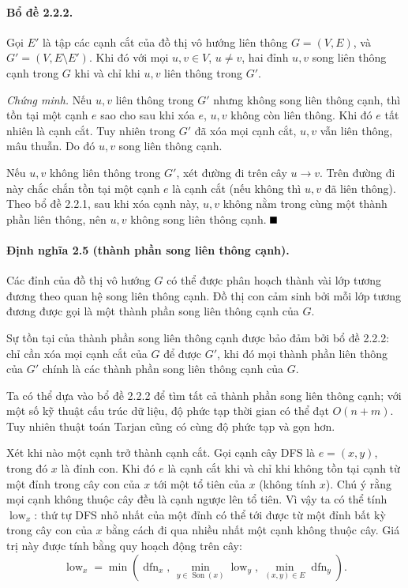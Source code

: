 \documentclass[11pt]{article}
\renewcommand{\leadsto}{\mathrel{\longrightarrow}}
\providecommand{\square}{\mathord{\vcenter{\hrule height .6em width .6em}}}
\begin{document}
\paragraph{Bổ đề 2.2.2.}
Gọi $E'$ là tập các cạnh cắt của đồ thị vô hướng liên thông $G=(V,E)$, và
$G'=(V,E\setminus E')$. Khi đó với mọi $u,v\in V$, $u\ne v$, hai đỉnh $u,v$
song liên thông cạnh trong $G$ khi và chỉ khi $u,v$ liên thông trong $G'$.

\emph{Chứng minh.}
Nếu $u,v$ liên thông trong $G'$ nhưng không song liên thông cạnh, thì tồn tại
một cạnh $e$ sao cho sau khi xóa $e$, $u,v$ không còn liên thông. Khi đó $e$ tất
nhiên là cạnh cắt. Tuy nhiên trong $G'$ đã xóa mọi cạnh cắt, $u,v$ vẫn liên
thông, mâu thuẫn. Do đó $u,v$ song liên thông cạnh.

Nếu $u,v$ không liên thông trong $G'$, xét đường đi trên cây $u\leadsto v$. Trên
đường đi này chắc chắn tồn tại một cạnh $e$ là cạnh cắt (nếu không thì $u,v$ đã
liên thông). Theo bổ đề 2.2.1, sau khi xóa cạnh này, $u,v$ không nằm trong cùng
một thành phần liên thông, nên $u,v$ không song liên thông cạnh. \hfill$\square$

\paragraph{Định nghĩa 2.5 (thành phần song liên thông cạnh).}
Các đỉnh của đồ thị vô hướng $G$ có thể được phân hoạch thành vài lớp tương
đương theo quan hệ song liên thông cạnh. Đồ thị con cảm sinh bởi mỗi lớp tương
đương được gọi là một thành phần song liên thông cạnh của $G$.

Sự tồn tại của thành phần song liên thông cạnh được bảo đảm bởi bổ đề 2.2.2: chỉ
cần xóa mọi cạnh cắt của $G$ để được $G'$, khi đó mọi thành phần liên thông của
$G'$ chính là các thành phần song liên thông cạnh của $G$.

Ta có thể dựa vào bổ đề 2.2.2 để tìm tất cả thành phần song liên thông cạnh; với
một số kỹ thuật cấu trúc dữ liệu, độ phức tạp thời gian có thể đạt $O(n+m)$.
Tuy nhiên thuật toán Tarjan cũng có cùng độ phức tạp và gọn hơn.

Xét khi nào một cạnh trở thành cạnh cắt. Gọi cạnh cây DFS là $e=(x,y)$, trong đó
$x$ là đỉnh con. Khi đó $e$ là cạnh cắt khi và chỉ khi không tồn tại cạnh từ một
đỉnh trong cây con của $x$ tới một tổ tiên của $x$ (không tính $x$). Chú ý rằng
mọi cạnh không thuộc cây đều là cạnh ngược lên tổ tiên. Vì vậy ta có thể tính
$\operatorname{low}_x$: thứ tự DFS nhỏ nhất của một đỉnh có thể tới được từ một
đỉnh bất kỳ trong cây con của $x$ bằng cách đi qua nhiều nhất một cạnh không
thuộc cây. Giá trị này được tính bằng quy hoạch động trên cây:
\[
\operatorname{low}_x=\min\left(\operatorname{dfn}_x,\,
  \min_{y\in\operatorname{Son}(x)}\operatorname{low}_y,\,
  \min_{(x,y)\in E}\operatorname{dfn}_y\right).
\]
\end{document}
